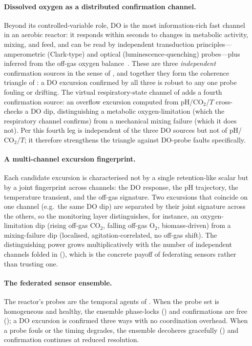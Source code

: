\documentclass[11pt,a4paper,twocolumn]{article}
\theoremstyle{thmstyle}
\theoremstyle{definition}
\theoremstyle{remark}
\begin{document}
\paragraph{Dissolved oxygen as a distributed confirmation channel.}
Beyond its controlled-variable role, DO is the most information-rich fast
channel in an aerobic reactor: it responds within seconds to changes in
metabolic activity, mixing, and feed, and can be read by independent
transduction principles---amperometric (Clark-type) and optical
(luminescence-quenching) probes---plus inferred from the off-gas oxygen
balance~\citep{garcia2009review,vanhauwaert2020dosensing}. These are three
\emph{independent} confirmation sources in the sense of
, and together they form the coherence triangle
of : a DO excursion confirmed by all three is robust to
any one probe fouling or drifting. The virtual respiratory-state channel
of  adds a fourth confirmation source: an
overflow excursion computed from pH/$\mathrm{CO_2}$/$T$ cross-checks a DO
dip, distinguishing a metabolic oxygen-limitation (which the respiratory
channel confirms) from a mechanical mixing failure (which it does not).
Per  this fourth leg is independent of the
three DO sources but not of pH/$\mathrm{CO_2}$/$T$; it therefore
strengthens the triangle against DO-probe faults specifically.

\paragraph{A multi-channel excursion fingerprint.}
Each candidate excursion is characterised not by a single retention-like
scalar but by a joint fingerprint across channels: the DO response, the
pH trajectory, the temperature transient, and the off-gas signature. Two
excursions that coincide on one channel (e.g.\ the same DO dip) are
separated by their joint signature across the others, so the monitoring
layer distinguishes, for instance, an oxygen-limitation dip (rising off-gas
$\mathrm{CO_2}$, falling off-gas $\mathrm{O_2}$, biomass-driven) from a
mixing-failure dip (localised, agitation-correlated, no off-gas shift).
The distinguishing power grows multiplicatively with the number of
independent channels folded in (),
which is the concrete payoff of federating sensors rather than trusting
one.

\paragraph{The federated sensor ensemble.}
The reactor's probes are the temporal agents of . When the
probe set is homogeneous and healthy, the ensemble phase-locks
() and confirmations are free (); a DO
excursion is confirmed three ways with no coordination overhead. When a
probe fouls or the timing degrades, the ensemble decoheres gracefully
() and confirmation continues at reduced resolution.
\end{document}
